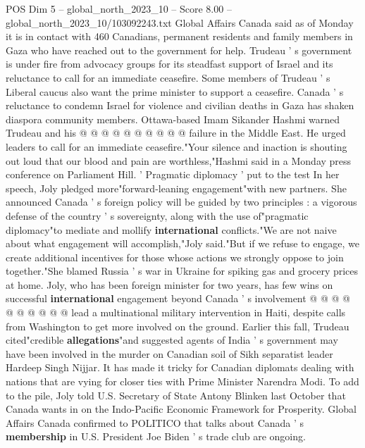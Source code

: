 \begin{textsample}{POS Dim 5 – global\_north\_2023\_10 – Score 8.00 – global\_north\_2023\_10/103092243.txt}
Global Affairs Canada said as of Monday it is in contact with 460 Canadians, permanent residents and family members in Gaza who have reached out to the government for help.
Trudeau ' s government is under fire from advocacy groups for its steadfast support of Israel and its reluctance to call for an immediate ceasefire.
Some members of Trudeau ' s Liberal caucus also want the prime minister to support a ceasefire.
Canada ' s reluctance to condemn Israel for violence and civilian deaths in Gaza has shaken diaspora community members.
Ottawa-based Imam Sikander Hashmi warned Trudeau and his @ @ @ @ @ @ @ @ @ @ failure in the Middle East.
He urged leaders to call for an immediate ceasefire."Your silence and inaction is shouting out loud that our blood and pain are worthless,"Hashmi said in a Monday press conference on Parliament Hill. ' Pragmatic diplomacy ' put to the test In her speech, Joly pledged more"forward-leaning engagement"with new partners.
She announced Canada ' s foreign policy will be guided by two principles : a vigorous defense of the country ' s sovereignty, along with the use of"pragmatic diplomacy"to mediate and mollify \textbf{international} conflicts."We are not naive about what engagement will accomplish,"Joly said."But if we refuse to engage, we create additional incentives for those whose actions we strongly oppose to join together."She blamed Russia ' s war in Ukraine for spiking gas and grocery prices at home.
Joly, who has been foreign minister for two years, has few wins on successful \textbf{international} engagement beyond Canada ' s involvement @ @ @ @ @ @ @ @ @ @ lead a multinational military intervention in Haiti, despite calls from Washington to get more involved on the ground.
Earlier this fall, Trudeau cited"credible \textbf{allegations}"and suggested agents of India ' s government may have been involved in the murder on Canadian soil of Sikh separatist leader Hardeep Singh Nijjar.
It has made it tricky for Canadian diplomats dealing with nations that are vying for closer ties with Prime Minister Narendra Modi.
To add to the pile, Joly told U.S.
Secretary of State Antony Blinken last October that Canada wants in on the Indo-Pacific Economic Framework for Prosperity.
Global Affairs Canada confirmed to POLITICO that talks about Canada ' s \textbf{membership} in U.S.
President Joe Biden ' s trade club are ongoing.

\end{textsample}
